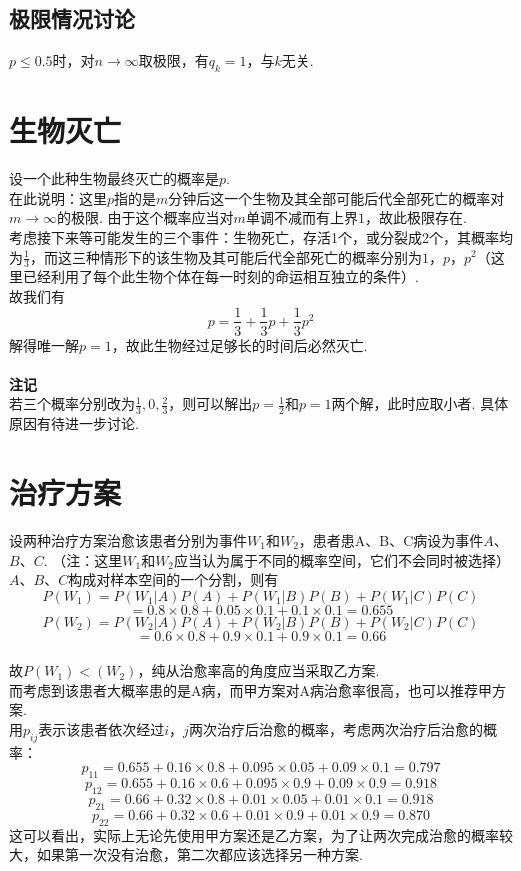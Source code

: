 \documentclass{article}
\begin{document}
\begin{CJK}{UTF8}{gbsn}
\subsection{极限情况讨论}
$p\leq 0.5$时，对$n\to \infty$取极限，有$q_{k}=1$，与$k$无关.
\section{生物灭亡}
设一个此种生物最终灭亡的概率是$p$.
\\在此说明：这里$p$指的是$m$分钟后这一个生物及其全部可能后代全部死亡的概率对$m\to \infty$的极限. 由于这个概率应当对$m$单调不减而有上界$1$，故此极限存在.
\\考虑接下来等可能发生的三个事件：生物死亡，存活1个，或分裂成2个，其概率均为$\frac{1}{3}$，而这三种情形下的该生物及其可能后代全部死亡的概率分别为$1$，$p$，$p^{2}$（这里已经利用了每个此生物个体在每一时刻的命运相互独立的条件）.
\\故我们有
$$ p=\frac{1}{3}+\frac{1}{3}p+\frac{1}{3}p^{2} $$
解得唯一解$p=1$，故此生物经过足够长的时间后必然灭亡.
\\\\
\textbf{注记}
\\若三个概率分别改为$\frac{1}{3},0,\frac{2}{3}$，则可以解出$p=\frac{1}{2}$和$p=1$两个解，此时应取小者. 具体原因有待进一步讨论.
\section{治疗方案}
设两种治疗方案治愈该患者分别为事件$W_{1}$和$W_{2}$，患者患A、B、C病设为事件$A$、$B$、$C$.
（注：这里$W_{1}$和$W_{2}$应当认为属于不同的概率空间，它们不会同时被选择）
\\$A$、$B$、$C$构成对样本空间的一个分割，则有
\\
$$ P(W_{1})=P(W_{1}|A)P(A)+P(W_{1}|B)P(B)+P(W_{1}|C)P(C) $$
$$ =0.8\times 0.8+0.05\times 0.1+0.1\times 0.1=0.655 $$
$$ P(W_{2})=P(W_{2}|A)P(A)+P(W_{2}|B)P(B)+P(W_{2}|C)P(C) $$
$$ =0.6\times 0.8+0.9\times 0.1+0.9\times 0.1=0.66 $$
\\
故$P(W_{1})<(W_{2})$，纯从治愈率高的角度应当采取乙方案.
\\而考虑到该患者大概率患的是A病，而甲方案对A病治愈率很高，也可以推荐甲方案. 
\\用$p_{ij}$表示该患者依次经过$i$，$j$两次治疗后治愈的概率，考虑两次治疗后治愈的概率：
$$ p_{11}=0.655+0.16\times 0.8+0.095\times 0.05+0.09\times 0.1=0.797 $$
$$ p_{12}=0.655+0.16\times 0.6+0.095\times 0.9+0.09\times 0.9=0.918 $$
$$ p_{21}=0.66+0.32\times 0.8+0.01\times 0.05+0.01\times 0.1=0.918 $$
$$ p_{22}=0.66+0.32\times 0.6+0.01\times 0.9+0.01\times 0.9=0.870 $$
这可以看出，实际上无论先使用甲方案还是乙方案，为了让两次完成治愈的概率较大，如果第一次没有治愈，第二次都应该选择另一种方案.

\end{CJK}
\end{document}
